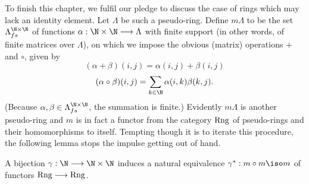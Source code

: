 To finish this chapter, we fulfil our pledge to discuss the case of rings which may lack an
 identity element. Let $\Lambda$ be such a pseudo-ring. Define $m\Lambda$ to be the set $\Lambda_{fs}^{\N\times \N}$ of functions
$\alpha:\N\times \N\longrightarrow \Lambda$ with finite support (in other words, of finite matrices over $\Lambda$), on which we impose the obvious (matrix) operations $+$ and $\circ$, given by
\[(\alpha+\beta)(i,j)=\alpha(i,j)+\beta(i,j)\]
\[(\alpha \circ \beta)(i,j)=\sum_{k\in \N} \alpha(i,k)\beta(k,j).\]
(Because $\alpha,\beta\in \Lambda_{fs}^{\N\times \N}$, the summation is finite.) Evidently $m\Lambda$ is another pseudo-ring and $m$ is in fact a functor from the category ${\rm Rng}$ of pseudo-rings and their homomorphisms to itself.
Tempting though it is to iterate this procedure, the following lemma stops the impulse getting out of hand.
\begin{lemma}
A bijection $\gamma:\N\longrightarrow \N\times \N$ induces a natural equivalence $\gamma^*:m\circ m\iso m$ of functors ${\rm Rng}\longrightarrow {\rm Rng}$.
\end{lemma}
